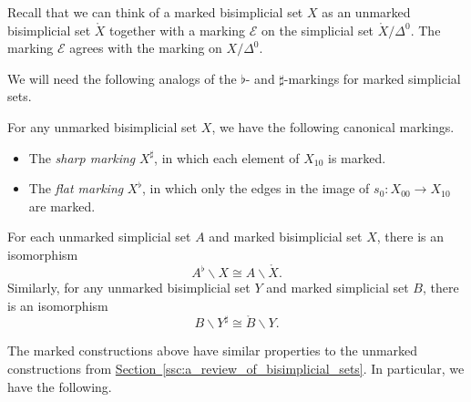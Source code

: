 \documentclass[main.tex]{subfiles}
\begin{document}
\begin{example}
  Recall that we can think of a marked bisimplicial set $X$ as an unmarked bisimplicial set $\mathring{X}$ together with a marking $\mathcal{E}$ on the simplicial set $\mathring{X} / \Delta^{0}$. The marking $\mathcal{E}$ agrees with the marking on $X / \Delta^{0}$.
\end{example}

We will need the following analogs of the $\flat$- and $\sharp$-markings for marked simplicial sets.

\begin{example}
  For any unmarked bisimplicial set $X$, we have the following canonical markings.
  \begin{itemize}
    \item The \emph{sharp marking} $X^{\sharp}$, in which each element of $X_{10}$ is marked.

    \item The \emph{flat marking} $X^{\flat}$, in which only the edges in the image of $s_{0}\colon X_{00} \to X_{10}$ are marked.
  \end{itemize}
\end{example}

\begin{example}
  For each unmarked simplicial set $A$ and marked bisimplicial set $X$, there is an isomorphism
  \begin{equation*}
    A^{\flat} \backslash X \cong A \backslash \mathring{X}.
  \end{equation*}
  Similarly, for any unmarked bisimplicial set $Y$ and marked simplicial set $B$, there is an isomorphism
  \begin{equation*}
    B \backslash Y^{\sharp} \cong \mathring{B} \backslash Y.
  \end{equation*}
\end{example}

The marked constructions above have similar properties to the unmarked constructions from \hyperref[ssc:a_review_of_bisimplicial_sets]{Section~\ref*{ssc:a_review_of_bisimplicial_sets}}. In particular, we have the following.
\end{document}
